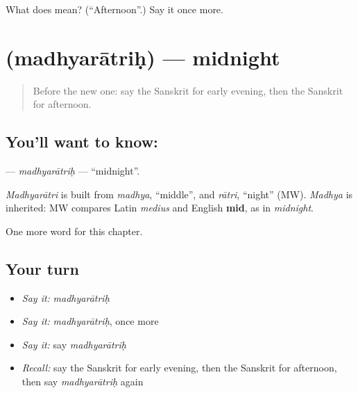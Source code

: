 \begin{tcolorbox}[breakable,colback=teal!4,colframe=teal!35!black,title={Before you move on}]
What does  mean? (\textquotedblleft{}Afternoon\textquotedblright{}.) Say it once more.
\end{tcolorbox}
\section[\texorpdfstring{\sk{मध्यरात्रिः} (madhyarātriḥ)}{मध्यरात्रिः (madhyarātriḥ)}]{ (madhyarātriḥ) — midnight}

\label{lesson:SA-C90-madhyaratrih}



\begin{quote}
Before the new one: say the Sanskrit for early evening, then the Sanskrit for afternoon.
\end{quote}

\subsection*{You'll want to know: }
\textbf{} — \emph{madhyarātriḥ} — \textquotedblleft{}midnight\textquotedblright{}.

\begin{cousinweb}
\emph{Madhyarātri} is built from \emph{madhya}, \textquotedblleft{}middle\textquotedblright{}, and \emph{rātri}, \textquotedblleft{}night\textquotedblright{} (MW). \emph{Madhya} is inherited: MW compares Latin \emph{medius} and English \textbf{mid}, as in \emph{midnight}.
\end{cousinweb}

\begin{grammarlens}[title={What you've built}]
One more word for this chapter.
\end{grammarlens}

\subsection*{Your turn}
\begin{itemize}
\raggedright
  \item \emph{Say it:} \emph{madhyarātriḥ}
  \item \emph{Say it:} \emph{madhyarātriḥ}, once more
  \item \emph{Say it:} say \emph{madhyarātriḥ}
  \item \emph{Recall:} say the Sanskrit for early evening, then the Sanskrit for afternoon, then say \emph{madhyarātriḥ} again
\end{itemize}

